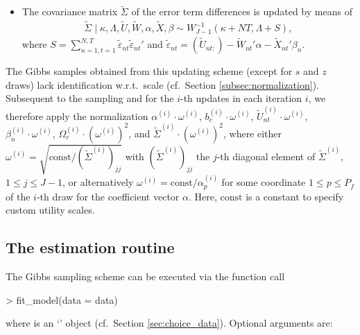 \documentclass[article]{jss}
\newcommand{\class}[1]{`\code{#1}'}
\begin{document}
\begin{itemize}
    \item The covariance matrix $\tilde{\Sigma}$ of the error term differences is updated by means of
  \begin{align*}
  \tilde{\Sigma} \mid \kappa,\Lambda,\tilde{U},\tilde{W},\alpha,\tilde{X},\beta \sim W^{-1}_{J-1}(\kappa+NT,\Lambda+S),
  \end{align*}
  where $S = \sum_{n=1,t=1}^{N,T} \tilde{\varepsilon}_{nt} \tilde{\varepsilon}_{nt}'$ and $\tilde{\varepsilon}_{nt} = (\tilde{U}_{nt:}) - \tilde{W}_{nt}'\alpha - \tilde{X}_{nt}'\beta_n$.
\end{itemize}

The Gibbs samples obtained from this updating scheme (except for $s$ and $z$ draws) lack identification w.r.t.\ scale (cf.\ Section \ref{subsec:normalization}). Subsequent to the sampling and for the $i$-th updates in each iteration $i$, we therefore apply the normalization $\alpha^{(i)} \cdot \omega^{(i)}$, $b_c^{(i)} \cdot \omega^{(i)}$, $\tilde{U}_{nt}^{(i)} \cdot \omega^{(i)}$, $\beta_n^{(i)} \cdot \omega^{(i)}$, $\Omega_c^{(i)} \cdot (\omega^{(i)})^2$, and $\tilde{\Sigma}^{(i)} \cdot (\omega^{(i)})^2$, where either $\omega^{(i)} = \sqrt{\text{const} / (\tilde{\Sigma}^{(i)})_{jj}}$ with $(\tilde{\Sigma}^{(i)})_{jj}$ the $j$-th diagonal element of $\tilde{\Sigma}^{(i)}$, $1\leq j \leq J-1$, or alternatively $\omega^{(i)} = \text{const} / \alpha^{(i)}_p$ for some coordinate $1\leq p \leq P_f$ of the $i$-th draw for the coefficient vector $\alpha$. Here, $\text{const}$ is a constant to specify custom utility scales.

\subsection{The estimation routine} \label{subsec:estimation_routine}

The Gibbs sampling scheme can be executed via the function call

\begin{Schunk}
\begin{Sinput}
> fit_model(data = data)
\end{Sinput}
\end{Schunk}

where  is an \class{RprobitB\_data} object (cf.\ Section \ref{sec:choice_data}). Optional arguments are:
\end{document}
